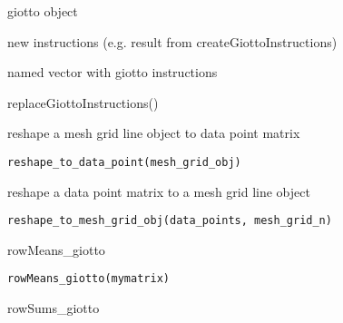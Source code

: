 \documentclass[a4paper]{book}
\begin{document}
%
\begin{Arguments}
\begin{ldescription}
\item[\code{gobject}] giotto object

\item[\code{instructions}] new instructions (e.g. result from createGiottoInstructions)
\end{ldescription}
\end{Arguments}
%
\begin{Value}
named vector with giotto instructions
\end{Value}
%
\begin{Examples}
\begin{ExampleCode}
    replaceGiottoInstructions()
\end{ExampleCode}
\end{Examples}
%
\begin{Description}\relax
reshape a mesh grid line object to data point matrix
\end{Description}
%
\begin{Usage}
\begin{verbatim}
reshape_to_data_point(mesh_grid_obj)
\end{verbatim}
\end{Usage}
%
\begin{Description}\relax
reshape a data point matrix to a mesh grid line object
\end{Description}
%
\begin{Usage}
\begin{verbatim}
reshape_to_mesh_grid_obj(data_points, mesh_grid_n)
\end{verbatim}
\end{Usage}
%
\begin{Description}\relax
rowMeans\_giotto
\end{Description}
%
\begin{Usage}
\begin{verbatim}
rowMeans_giotto(mymatrix)
\end{verbatim}
\end{Usage}
%
\begin{Description}\relax
rowSums\_giotto
\end{Description}
\end{document}
